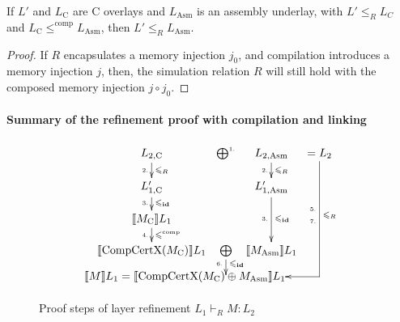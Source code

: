 \begin{lemma} \label{lem:sim-absorb-comp}
If $L'$ and $L_\text{C}$ are C overlays and $L_{\text{Asm}}$ is
an assembly underlay, with $L' \leqslant_R L_C$ and $L_\text{C} \leqslant^{\textrm{comp}} L_{\text{Asm}}$, then $L' \leqslant_R L_{\text{Asm}}$.
\end{lemma}
\begin{proof} 
If $R$ encapsulates a memory injection $j_0$, and compilation introduces a
memory injection $j$, then, the simulation relation $R$ will still hold with
the composed memory injection $j \circ j_0$.
\end{proof}

\paragraph{Summary of the refinement proof with compilation and linking}

\begin{figure}[t]
\[
\xymatrix@R=12pt@C=3pt{
%
L_{2, \text{C}} \ar[d]^{\leqslant_R}_{\text{\tiny 2.}} &
\bigoplus^{\text{\tiny 1.}} &
L_{2, \text{Asm}} \ar[d]^{\leqslant_R}_{\text{\tiny 2.}} &
= L_2 \\
%
L'_{1, \text{C}} \ar[d]^{\leqslant_\id}_{\text{\tiny 3.}} & &
L'_{1, \text{Asm}} \ar[dd]^{\leqslant_\id}_{\text{\tiny 3.}} \\
%
\llbracket M_\text{C} \rrbracket L_1
\ar[d]^{\leqslant^{\textrm{comp}}}_{\text{\tiny 4.}} \\
%
\llbracket \textrm{CompCertX}(M_\text{C}) \rrbracket L_1 &
\bigoplus \ar[d]^{\leqslant_\id}_{\text{\tiny 6.}} &
\llbracket M_\text{Asm} \rrbracket L_1 \\
%
& \save[]+<-37.90pt,0pt>*\txt{
$\llbracket M \rrbracket L_1 =
 \llbracket \textrm{CompCertX}(M_\text{C}) \oplus M_\text{Asm} \rrbracket L_1$
}
\ar@{<-} `_r[rr] [uuuurr]_{\leqslant_R}^{\txt{\tiny 5.\\ \tiny 7.}}
\restore
& &
}
\]
\caption{Proof steps of layer refinement $L_1 \vdash_R M : L_2$}
\label{fig:layer-refinement-proof}
\hrulefill
\end{figure}


